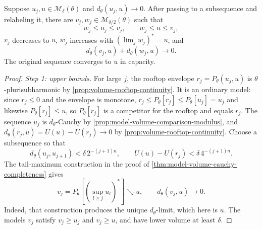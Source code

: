 \begin{theorem}\label{thm:model-volume-capacity-convergence}
Suppose $u_j,u\in\mathcal M_\delta(\theta)$ and $d_\theta(u_j,u)\to0$. After passing to a subsequence and relabeling it, there are $v_j,w_j\in\mathcal M_{\delta/2}(\theta)$ such that
\[
 w_j\leq u_j\leq v_j,\qquad w_j\leq u\leq v_j,
\]
$v_j$ decreases to $u$, $w_j$ increases with $(\lim_jw_j)^*=u$, and
\[
 d_\theta(v_j,u)+d_\theta(w_j,u)\longrightarrow0.
\]
The original sequence converges to $u$ in capacity.
\end{theorem}
\begin{proof}
\emph{Step 1: upper bounds.} For large $j$, the rooftop envelope $r_j=P_\theta(u_j,u)$ is $\theta$-plurisubharmonic by \cref{prop:volume-rooftop-continuity}. It is an ordinary model: since $r_j\leq0$ and the envelope is monotone,
$r_j\leq P_\theta[r_j]\leq P_\theta[u_j]=u_j$ and likewise $P_\theta[r_j]\leq u$, so $P_\theta[r_j]$ is a competitor for the rooftop and equals $r_j$. The sequence $u_j$ is $d_\theta$-Cauchy by \cref{prop:model-volume-comparison-modulus}, and $d_\theta(r_j,u)=U(u)-U(r_j)\to0$ by \cref{prop:volume-rooftop-continuity}. Choose a subsequence so that
\[
 d_\theta(u_j,u_{j+1})<\delta\,2^{-(j+1)n},\qquad
 U(u)-U(r_j)<\delta\,4^{-(j+1)n}.
\]
The tail-maximum construction in the proof of \cref{thm:model-volume-cauchy-completeness} gives
\[
 v_j=P_\theta\left[\left(\sup_{l\geq j}u_l\right)^*\right]
       \searrow u,\qquad d_\theta(v_j,u)\longrightarrow0.
\]
Indeed, that construction produces the unique $d_\theta$-limit, which here is $u$. The models $v_j$ satisfy $v_j\geq u_j$ and $v_j\geq u$, and have lower volume at least $\delta$.


\end{proof}
